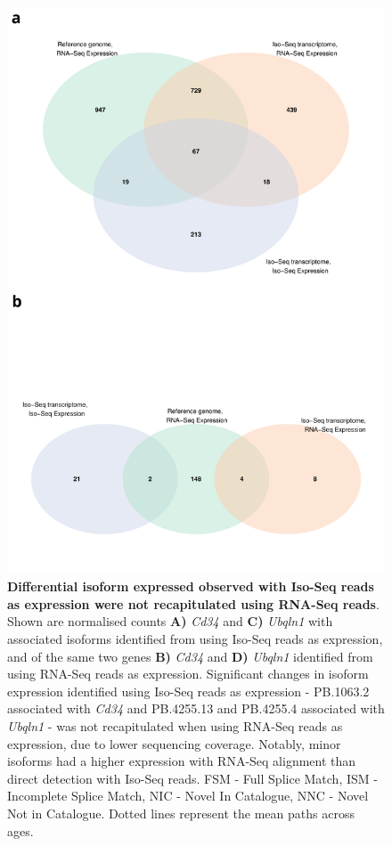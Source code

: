 \begin{figure}[!htp]
	\centering
	\includegraphics[page=15,scale = 0.55]{Figures/WholeDifferentialAnalysis.pdf}
	\captionsetup{width=0.95\textwidth}
	\caption[Differential isoform expressed observed with Iso-Seq reads as expression were not recapitulated using RNA-Seq reads]%
	{\textbf{Differential isoform expressed observed with Iso-Seq reads as expression were not recapitulated using RNA-Seq reads}. Shown are normalised counts \textbf{A)} \textit{Cd34} and \textbf{C)} \textit{Ubqln1} with associated isoforms identified from using Iso-Seq reads as expression, and of the same two genes \textbf{B)} \textit{Cd34} and \textbf{D)} \textit{Ubqln1} identified from using RNA-Seq reads as expression. Significant changes in isoform expression identified using Iso-Seq reads as expression - PB.1063.2 associated with \textit{Cd34} and PB.4255.13 and PB.4255.4 associated with \textit{Ubqln1} - was not recapitulated when using RNA-Seq reads as expression, due to lower sequencing coverage. Notably, minor isoforms had a higher expression with RNA-Seq alignment than direct detection with Iso-Seq reads.
	FSM - Full Splice Match, ISM - Incomplete Splice Match, NIC - Novel In Catalogue, NNC - Novel Not in Catalogue. Dotted lines represent the mean paths across ages.
	}   
	\label{fig:dei_lowisoexp}
\end{figure}

